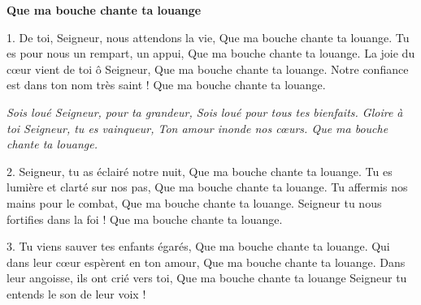 \textbf{Que ma bouche chante ta louange}

1. De toi, Seigneur, nous attendons la vie, Que ma bouche chante ta louange. Tu es pour nous un rempart, un appui, Que ma bouche chante ta louange. La joie du cœur vient de toi ô Seigneur, Que ma bouche chante ta louange. Notre confiance est dans ton nom très saint ! Que ma bouche chante ta louange.

\emph{
Sois loué Seigneur, pour ta grandeur, Sois loué pour tous tes bienfaits.
Gloire à toi Seigneur, tu es vainqueur, Ton amour inonde nos cœurs. Que ma bouche chante ta louange.}

2. Seigneur, tu as éclairé notre nuit, Que ma bouche chante ta louange.
Tu es lumière et clarté sur nos pas, Que ma bouche chante ta louange.
Tu affermis nos mains pour le combat, Que ma bouche chante ta louange.
Seigneur tu nous fortifies dans la foi ! Que ma bouche chante ta louange.

3. Tu viens sauver tes enfants égarés, Que ma bouche chante ta louange.
Qui dans leur cœur espèrent en ton amour, Que ma bouche chante ta louange. Dans leur angoisse, ils ont crié vers toi, Que ma bouche chante ta louange Seigneur tu entends le son de leur voix !

